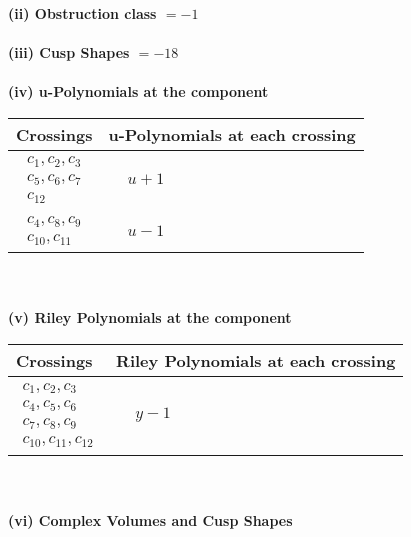 \documentclass[1p]{elsarticle_modified}
\theoremstyle{definition}
\begin{document}
\flushleft \textbf{(ii) Obstruction class $= -1$}\\~\\
\flushleft \textbf{(iii) Cusp Shapes $= -18$}\\~\\
\newpage\renewcommand{\arraystretch}{1}
\flushleft \textbf{(iv) u-Polynomials at the component}\newline \\
\begin{tabular}{m{50pt}|m{274pt}}
Crossings & \hspace{64pt}u-Polynomials at each crossing \\
\hline $$\begin{aligned}c_{1},c_{2},c_{3}\\c_{5},c_{6},c_{7}\\c_{12}\end{aligned}$$&$\begin{aligned}
&u+1
\end{aligned}$\\
\hline $$\begin{aligned}c_{4},c_{8},c_{9}\\c_{10},c_{11}\end{aligned}$$&$\begin{aligned}
&u-1
\end{aligned}$\\
\hline
\end{tabular}\\~\\
\newpage\renewcommand{\arraystretch}{1}
\flushleft \textbf{(v) Riley Polynomials at the component}\newline \\
\begin{tabular}{m{50pt}|m{274pt}}
Crossings & \hspace{64pt}Riley Polynomials at each crossing \\
\hline $$\begin{aligned}c_{1},c_{2},c_{3}\\c_{4},c_{5},c_{6}\\c_{7},c_{8},c_{9}\\c_{10},c_{11},c_{12}\end{aligned}$$&$\begin{aligned}
&y-1
\end{aligned}$\\
\hline
\end{tabular}\\~\\
\newpage\flushleft \textbf{(vi) Complex Volumes and Cusp Shapes}
\end{document}
